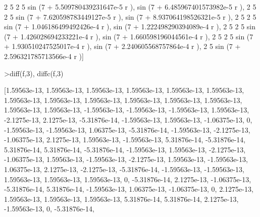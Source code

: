 \documentclass[a4paper,10pt]{article}
\begin{document}
\begin{eulernotebook}
\begin{eulercomment}
\begin{eulercomment}
\begin{eulercomment}
\begin{eulercomment}
\begin{eulercomment}
\begin{eulercomment}
\begin{eulercomment}
\begin{eulercomment}
\begin{eulercomment}
\begin{eulercomment}
\begin{eulercomment}
\begin{eulercomment}
\begin{eulercomment}
\begin{eulercomment}
\begin{eulercomment}
\begin{eulercomment}
\begin{eulercomment}
\begin{eulercomment}
\begin{eulercomment}
\begin{eulercomment}
\begin{eulercomment}
\begin{eulercomment}
\begin{eulercomment}
\begin{eulercomment}
\begin{eulercomment}
\begin{eulercomment}
\begin{eulercomment}
\begin{eulercomment}
\begin{euleroutput}
     2                           5      2                           5
  sin (7 + 5.509780439231647e-5 r ), sin (7 + 6.485967401573982e-5 r ), 
     2                           5      2                           5
  sin (7 + 7.620598783449127e-5 r ), sin (7 + 8.937064198526321e-5 r ), 
     2                           5      2                           5
  sin (7 + 1.046186499492426e-4 r ), sin (7 + 1.222498290394089e-4 r ), 
     2                           5      2                           5
  sin (7 + 1.426028694233221e-4 r ), sin (7 + 1.660598196044561e-4 r ), 
     2                           5      2                           5
  sin (7 + 1.930510247525017e-4 r ), sin (7 + 2.240605568757864e-4 r ), 
     2                           5
  sin (7 + 2.596321785713566e-4 r )]
  
\end{euleroutput}
\begin{eulerprompt}
>diff(f,3), diffc(f,3)
\end{eulerprompt}
\begin{euleroutput}
  [1.59563e-13,  1.59563e-13,  1.59563e-13,  1.59563e-13,  1.59563e-13,
  1.59563e-13,  1.59563e-13,  1.59563e-13,  1.59563e-13,  1.59563e-13,
  1.59563e-13,  1.59563e-13,  1.59563e-13,  1.59563e-13,  -1.59563e-13,
  -1.59563e-13,  -1.59563e-13,  1.59563e-13,  -2.1275e-13,  2.1275e-13,
  -5.31876e-14,  -1.59563e-13,  1.59563e-13,  -1.06375e-13,  0,
  -1.59563e-13,  -1.59563e-13,  1.06375e-13,  -5.31876e-14,
  -1.59563e-13,  -2.1275e-13,  -1.06375e-13,  2.1275e-13,  1.59563e-13,
  -1.59563e-13,  5.31876e-14,  -5.31876e-14,  5.31876e-14,  5.31876e-14,
  -5.31876e-14,  -1.59563e-13,  1.59563e-13,  -2.1275e-13,
  -1.06375e-13,  1.59563e-13,  -1.59563e-13,  -2.1275e-13,  1.59563e-13,
  -1.59563e-13,  1.06375e-13,  2.1275e-13,  -2.1275e-13,  -5.31876e-14,
  -1.59563e-13,  -1.59563e-13,  1.59563e-13,  1.59563e-13,  1.59563e-13,
  0,  -5.31876e-14,  2.1275e-13,  -1.06375e-13,  -5.31876e-14,
  5.31876e-14,  -1.59563e-13,  1.06375e-13,  -1.06375e-13,  0,
  2.1275e-13,  1.59563e-13,  1.59563e-13,  1.59563e-13,  5.31876e-14,
  5.31876e-14,  2.1275e-13,  -1.59563e-13,  0,  -5.31876e-14,

\end{euleroutput}
\end{eulercomment}
\end{eulercomment}
\end{eulercomment}
\end{eulercomment}
\end{eulercomment}
\end{eulercomment}
\end{eulercomment}
\end{eulercomment}
\end{eulercomment}
\end{eulercomment}
\end{eulercomment}
\end{eulercomment}
\end{eulercomment}
\end{eulercomment}
\end{eulercomment}
\end{eulercomment}
\end{eulercomment}
\end{eulercomment}
\end{eulercomment}
\end{eulercomment}
\end{eulercomment}
\end{eulercomment}
\end{eulercomment}
\end{eulercomment}
\end{eulercomment}
\end{eulercomment}
\end{eulercomment}
\end{eulercomment}
\end{eulernotebook}
\end{document}
